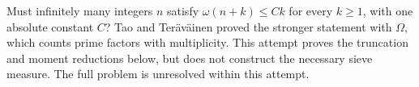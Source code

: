 Must infinitely many integers $n$ satisfy
$\omega(n+k)\leq Ck$ for every $k\geq1$, with one absolute
constant $C$? Tao and Ter\"av\"ainen proved the stronger
statement with $\Omega$, which counts prime factors with
multiplicity. This attempt proves the truncation and moment
reductions below, but does not construct the necessary sieve
measure. The full problem is unresolved within this attempt.
